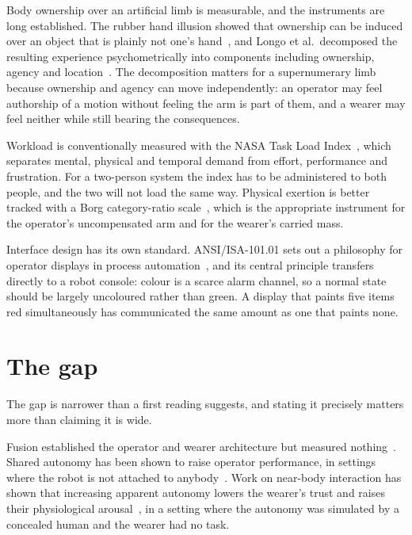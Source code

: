 Body ownership over an artificial limb is measurable, and the instruments are
long established. The rubber hand illusion showed that ownership can be
induced over an object that is plainly not one's
hand~\cite{botvinick1998rubber}, and Longo et al.\ decomposed the resulting
experience psychometrically into components including ownership, agency and
location~\cite{longo2008embodiment}. The decomposition matters for a
supernumerary limb because ownership and agency can move independently: an
operator may feel authorship of a motion without feeling the arm is part of
them, and a wearer may feel neither while still bearing the consequences.

Workload is conventionally measured with the NASA Task Load
Index~\cite{hart1988nasatlx}, which separates mental, physical and temporal
demand from effort, performance and frustration. For a two-person system the
index has to be administered to both people, and the two will not load the
same way. Physical exertion is better tracked with a Borg category-ratio
scale~\cite{borg1982perceived}, which is the appropriate instrument for the
operator's uncompensated arm and for the wearer's carried mass.

Interface design has its own standard. ANSI/ISA-101.01 sets out a philosophy
for operator displays in process
automation~\cite{isa101}, and its central principle transfers directly to a
robot console: colour is a scarce alarm channel, so a normal state should be
largely uncoloured rather than green. A display that paints five items red
simultaneously has communicated the same amount as one that paints none.

\section{The gap}

The gap is narrower than a first reading suggests, and stating it precisely
matters more than claiming it is wide.

Fusion established the operator and wearer architecture but measured
nothing~\cite{saraiji2018fusion}. Shared autonomy has been shown to raise
operator performance, in settings where the robot is not attached to
anybody~\cite{dragan2013policyblending,javdani2015hindsight}. Work on
near-body interaction has shown that increasing apparent autonomy lowers the
wearer's trust and raises their physiological
arousal~\cite{zhou2026proxemics}, in a setting where the autonomy was
simulated by a concealed human and the wearer had no task.

